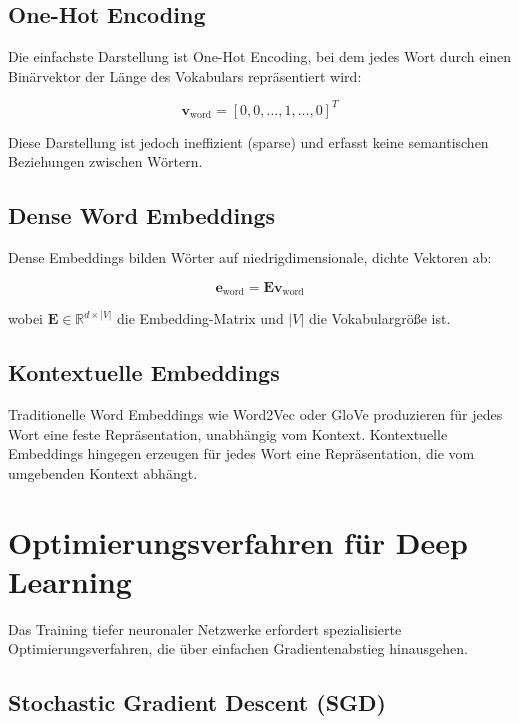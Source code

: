 \subsection{One-Hot Encoding}

Die einfachste Darstellung ist One-Hot Encoding, bei dem jedes Wort durch einen Binärvektor der Länge des Vokabulars repräsentiert wird:

\begin{equation}
\mathbf{v}_{\text{word}} = [0, 0, \ldots, 1, \ldots, 0]^T
\end{equation}

Diese Darstellung ist jedoch ineffizient (sparse) und erfasst keine semantischen Beziehungen zwischen Wörtern.

\subsection{Dense Word Embeddings}

Dense Embeddings bilden Wörter auf niedrigdimensionale, dichte Vektoren ab:

\begin{equation}
\mathbf{e}_{\text{word}} = \mathbf{E} \mathbf{v}_{\text{word}}
\end{equation}

wobei $\mathbf{E} \in \mathbb{R}^{d \times |V|}$ die Embedding-Matrix und $|V|$ die Vokabulargröße ist.

\subsection{Kontextuelle Embeddings}

Traditionelle Word Embeddings wie Word2Vec oder GloVe produzieren für jedes Wort eine feste Repräsentation, unabhängig vom Kontext. Kontextuelle Embeddings hingegen erzeugen für jedes Wort eine Repräsentation, die vom umgebenden Kontext abhängt.

\section{Optimierungsverfahren für Deep Learning}

Das Training tiefer neuronaler Netzwerke erfordert spezialisierte Optimierungsverfahren, die über einfachen Gradientenabstieg hinausgehen.

\subsection{Stochastic Gradient Descent (SGD)}

